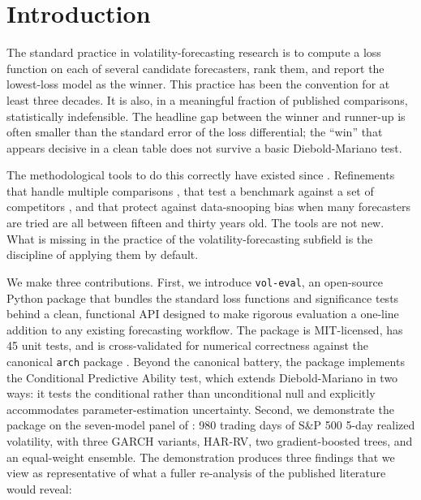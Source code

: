 \section{Introduction}\label{sec:intro}

The standard practice in volatility-forecasting research is to compute a loss function on each of several candidate forecasters, rank them, and report the lowest-loss model as the winner. This practice has been the convention for at least three decades. It is also, in a meaningful fraction of published comparisons, statistically indefensible. The headline gap between the winner and runner-up is often smaller than the standard error of the loss differential; the ``win'' that appears decisive in a clean table does not survive a basic Diebold-Mariano test.

The methodological tools to do this correctly have existed since \citet{DieboldMariano1995}. Refinements that handle multiple comparisons \citep{HansenLundeNason2011}, that test a benchmark against a set of competitors \citep{Hansen2005}, and that protect against data-snooping bias when many forecasters are tried \citep{White2000} are all between fifteen and thirty years old. The tools are not new. What is missing in the practice of the volatility-forecasting subfield is the discipline of applying them by default.

We make three contributions. First, we introduce \texttt{vol-eval}, an open-source Python package that bundles the standard loss functions and significance tests behind a clean, functional API designed to make rigorous evaluation a one-line addition to any existing forecasting workflow. The package is MIT-licensed, has 45 unit tests, and is cross-validated for numerical correctness against the canonical \texttt{arch} package \citep{Sheppard2023}. Beyond the canonical battery, the package implements the \citet{GiacominiWhite2006} Conditional Predictive Ability test, which extends Diebold-Mariano in two ways: it tests the conditional rather than unconditional null and explicitly accommodates parameter-estimation uncertainty. Second, we demonstrate the package on the seven-model panel of \citet{KhanVol2026}: 980 trading days of S\&P 500 5-day realized volatility, with three GARCH variants, HAR-RV, two gradient-boosted trees, and an equal-weight ensemble. The demonstration produces three findings that we view as representative of what a fuller re-analysis of the published literature would reveal:

